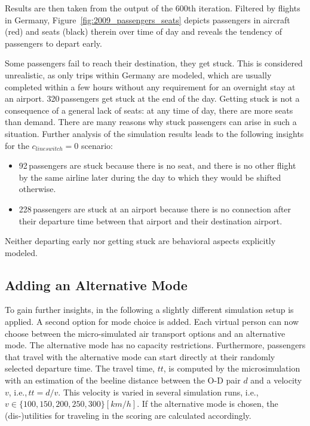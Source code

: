 Results are then taken from the output of the 600th iteration. 
Filtered by flights in Germany, Figure~\ref{fig:2009_passengers_seats} depicts passengers in aircraft (red) and seats (black) therein over time of day
and reveals the tendency of passengers to depart early. 

Some passengers fail to reach their destination, they get stuck.   
This is considered unrealistic, as only trips within Germany are modeled, which are usually completed within a few hours without any requirement for an overnight stay at an airport. 
320\,passengers get stuck at the end of the day. 
Getting stuck is not a consequence of a general lack of seats: at any time of day, there are more seats than demand.  
%
There are many reasons why stuck passengers can arise in such a situation.
%
Further analysis of the simulation results leads to the following insights for the $c_{lineswitch} = 0$ scenario:
\begin{itemize}

\item 92\,passengers are stuck because there is no seat, and there is no other flight by the same airline later during the day to which they would be shifted otherwise.

\item 228\,passengers are stuck at an airport because there is no connection after their departure time 
	between that airport and their destination airport. 
\end{itemize}

Neither departing early nor getting stuck are behavioral aspects explicitly modeled.  

\subsection{Adding an Alternative Mode}

To gain further insights, in the following a slightly different simulation setup is applied. 
A second option for mode choice is added. 
Each virtual person can now choose between the micro-simulated air transport options and an alternative mode. 
The alternative mode has no capacity restrictions. 
Furthermore, passengers that travel with the alternative mode can start directly at their randomly selected departure time. 
The travel time, $tt$, is computed by the microsimulation with an estimation of the beeline distance between the O-D pair $d$ and a velocity $v$, i.e.,\,$tt = d / v$.  
This velocity is varied in several simulation runs, i.e.,\,$v \in \{100, 150, 200, 250, 300 \} [km/h]$. 
If the alternative mode is chosen, the (dis-)utilities for traveling in the scoring are calculated accordingly.  


